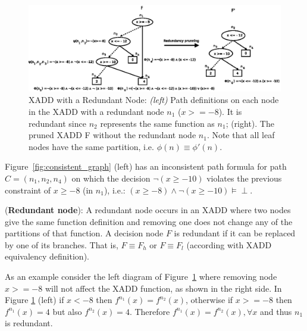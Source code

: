 \documentclass[twoside,11pt]{article}
\newenvironment{mydef}[1][Definition]{\begin{trivlist}
\item[\hskip \labelsep {\bfseries #1}]}{\end{trivlist}}
\begin{document}

\begin{figure}[t!]
\centering
\includegraphics[width=1\textwidth]{FiguresSource/redundancyPrunning.eps}
\vspace{-2mm}
\caption{%
XADD with a Redundant Node:  {\it (left)} Path definitions on each node in the XADD with a redundant node $n_1$  ($x>=-8$). It is redundant since $n_2$ represents the same function as $n_1$; (right). The pruned XADD F without the redundant node $n_1$. Note that all leaf nodes have the same partition, i.e. $\phi(n) \equiv \phi'(n)$.}
\label{fig:redundant_graph}
\end{figure}


Figure~\ref{fig:consistent_graph} (left) has an inconsistent path formula for path $C=(n_1, n_2, n_4)$ on which the decision $\neg(x \geq -10)$ violates the previous constraint of $x\geq -8$ (in $n_1$), i.e.: $(x \geq -8) \wedge \neg(x \geq -10) \models\perp$.  

\begin{mydef}(\textbf{Redundant node}):
A redundant node occurs in an XADD where two nodes give the same function definition and removing one does not change any of the partitions of that function. A decision node $F$ is redundant if it can be replaced by one of its branches. That is, $F \equiv F_h$ or $F \equiv F_l$ (according with XADD equivalency definition). 
\end{mydef}

As an example consider the left diagram of Figure~\ref{fig:redundant_graph} where removing node $x>=-8$ will not affect the XADD function, as shown in the right side. In Figure \ref{fig:redundant_graph} (left) if $x < - 8$ then $f^{n_1}(x)=f^{n_2}(x)$, otherwise if $x >= - 8$ then $f^{n_1}(x)=4$ but also $f^{n_2}(x)=4$. Therefore  $f^{n_1}(x)=f^{n_2}(x), \forall x$ and thus $n_1$ is redundant.  
\end{document}
